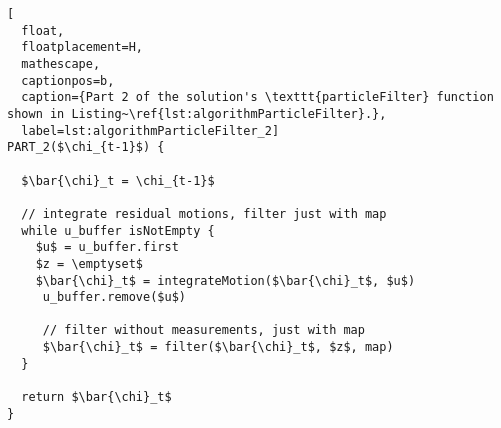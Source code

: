 \begin{lstlisting}[
  float,
  floatplacement=H,
  mathescape,
  captionpos=b,
  caption={Part 2 of the solution's \texttt{particleFilter} function shown in Listing~\ref{lst:algorithmParticleFilter}.},
  label=lst:algorithmParticleFilter_2]
PART_2($\chi_{t-1}$) {

  $\bar{\chi}_t = \chi_{t-1}$

  // integrate residual motions, filter just with map
  while u_buffer isNotEmpty {
    $u$ = u_buffer.first
    $z = \emptyset$
    $\bar{\chi}_t$ = integrateMotion($\bar{\chi}_t$, $u$)
     u_buffer.remove($u$)

     // filter without measurements, just with map
     $\bar{\chi}_t$ = filter($\bar{\chi}_t$, $z$, map)
  }

  return $\bar{\chi}_t$
}
\end{lstlisting}
